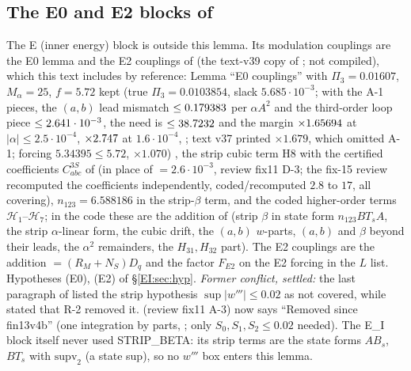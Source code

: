 \documentclass[11pt]{article}
\begin{document}
\subsection[The E0 and E2 blocks of fin13v4c]{The E0 and E2 blocks of }\label{EI:sec:E0E2}
The E (inner energy) block is outside this lemma. Its modulation couplings are the E0 lemma and the E2 couplings of  (the text-v39 copy of ; not compiled), which this text includes by reference: Lemma ``E0 couplings'' with $\Pi_3=0.01607$, $M_\alpha=25$, $f=5.72$ kept (true $\Pi_3=0.0103854$, slack $5.685\cdot10^{-3}$; with the A-1 pieces, the $(a,b)$ lead mismatch $\le0.179383$ per $\alpha A^2$ and the third-order loop piece $\le2.641\cdot10^{-3}$, the need is $\le38.7232$ and the margin $\times1.65694$ at $|\alpha|\le2.5\cdot10^{-4}$, $\times2.747$ at $1.6\cdot10^{-4}$,  ; text v37 printed $\times1.679$, which omitted A-1; forcing $5.34395\le5.72$, $\times1.070$) \tC, the strip cubic term H8 with the certified coefficients $C^{3S}_{abc}$ of  (in place of $=2.6\cdot10^{-3}$, review fix11 D-3; the fix-15 review recomputed the coefficients independently, coded/recomputed $2.8$ to $17$, all covering), $n_{123}=6.588186$ in the strip-$\beta$ term, and the coded higher-order terms $\mathcal H_1$--$\mathcal H_7$; in the code these are the addition  of  (strip $\beta$ in state form $n_{123}BT_sA$, the strip $\alpha$-linear form, the cubic drift, the $(a,b)$ $w$-parts, $(a,b)$ and $\beta$ beyond their leads, the $\alpha^2$ remainders, the $H_{31},H_{32}$ part). The E2 couplings are the addition  $=(R_M+N_S)D_q$ and the factor $F_{E2}$ on the E2 forcing in the $L$ list. Hypotheses (E0), (E2) of \S\ref{EI:sec:hyp}.
\emph{Former conflict, settled:} the last paragraph of  listed the strip hypothesis $\sup|w'''|\le0.02$ as not covered, while  stated that R-2 removed it.  (review fix11 A-3) now says ``Removed since fin13v4b'' (one integration by parts, ; only $S_0,S_1,S_2\le0.02$ needed). The E\_I block itself never used STRIP\_BETA: its strip terms are the state forms $AB_s$, $BT_s$ with $\mathrm{supv}_2$ (a state sup), so no $w'''$ box enters this lemma.
\end{document}
